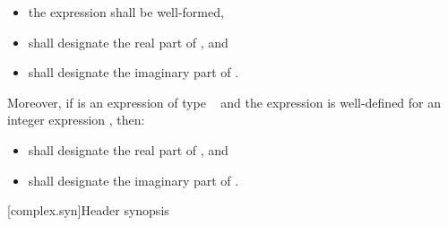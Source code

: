 \begin{itemize}
\item the expression  shall be well-formed,
\item {} shall designate the real part of , and
\item {} shall designate the imaginary part of .
\end{itemize}

Moreover, if  is an expression of type \cv{}~ and the expression  is well-defined for an integer expression , then:

\begin{itemize}
\item {} shall designate the real part of , and
\item {} shall designate the imaginary part of .
\end{itemize}

[complex.syn]{Header  synopsis}

